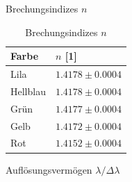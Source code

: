 \documentclass[12pt,a4paper,twoside]{article}
\begin{document}
\noindent
Brechungsindizes $n$ \\

\begin{table}[H]
    \centering
    \caption{Brechungsindizes $n$}
    \label{tab:zus delta n}
    \begin{tabular}{| l | l |}
        \hline
        Farbe & $n$ [1] \\
        \hline
        Lila        & $ 1.4178 \pm 0.0004 $ \\
        Hellblau    & $ 1.4178 \pm 0.0004 $ \\
        Grün        & $ 1.4177 \pm 0.0004 $ \\
        Gelb        & $ 1.4172 \pm 0.0004 $ \\
        Rot         & $ 1.4152 \pm 0.0004 $ \\
        \hline
    \end{tabular}
\end{table}

\noindent
Auflösungsvermögen $\lambda / \Delta \lambda$

\printbibliography[heading=bibintoc]
\end{document}
